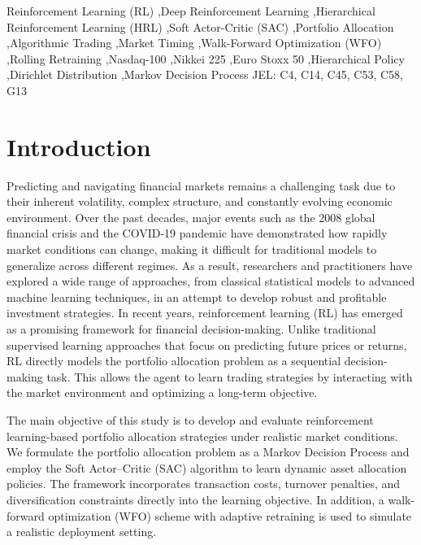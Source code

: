 \documentclass[]{elsarticle}
\begin{document}
\begin{frontmatter}
  
  \begin{keyword}
    Reinforcement Learning (RL) \sep Deep Reinforcement Learning \sep Hierarchical Reinforcement Learning (HRL) \sep Soft Actor-Critic (SAC) \sep Portfolio Allocation \sep Algorithmic Trading \sep Market Timing \sep  Walk-Forward Optimization (WFO) \sep Rolling Retraining \sep Nasdaq-100 \sep Nikkei 225 \sep Euro Stoxx 50 \sep Hierarchical Policy \sep Dirichlet Distribution \sep Markov Decision Process \newline
    JEL: C4, C14, C45, C53, C58, G13
  \end{keyword}
  
 \end{frontmatter}

\linespread{1.5}\selectfont

\hypertarget{introduction}{%
\section{Introduction}\label{introduction}}

Predicting and navigating financial markets remains a challenging task due to their inherent volatility, complex structure, and constantly evolving economic environment. Over the past decades, major events such as the 2008 global financial crisis and the COVID-19 pandemic have demonstrated how rapidly market conditions can change, making it difficult for traditional models to generalize across different regimes. As a result, researchers and practitioners have explored a wide range of approaches, from classical statistical models to advanced machine learning techniques, in an attempt to develop robust and profitable investment strategies. In recent years, reinforcement learning (RL) has emerged as a promising framework for financial decision-making. Unlike traditional supervised learning approaches that focus on predicting future prices or returns, RL directly models the portfolio allocation problem as a sequential decision-making task. This allows the agent to learn trading strategies by interacting with the market environment and optimizing a long-term objective.

The main objective of this study is to develop and evaluate reinforcement learning-based portfolio allocation strategies under realistic market conditions. We formulate the portfolio allocation problem as a Markov Decision Process and employ the Soft Actor--Critic (SAC) algorithm to learn dynamic asset allocation policies. The framework incorporates transaction costs, turnover penalties, and diversification constraints directly into the learning objective. In addition, a walk-forward optimization (WFO) scheme with adaptive retraining is used to simulate a realistic deployment setting.
\end{document}
